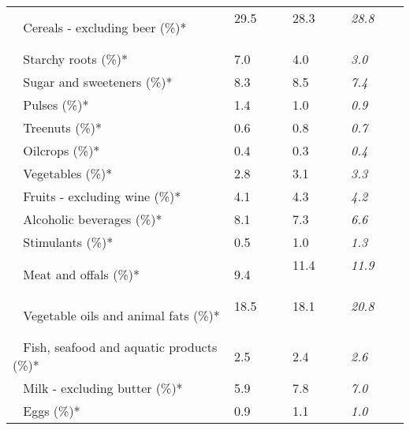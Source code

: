 \begin{tabular}{L{3.9cm} R{1cm} R{1cm} R{1cm}}
	 ~ Cereals - excluding beer (\%)* & 29.5 ~ \ \ & 28.3 ~ \ \ & \textit{28.8} ~ \ \ \\ 
	 ~ Starchy roots (\%)* & 7.0 ~ \ \ & 4.0 ~ \ \ & \textit{3.0} ~ \ \ \\ 
	 ~ Sugar and sweeteners (\%)* & 8.3 ~ \ \ & 8.5 ~ \ \ & \textit{7.4} ~ \ \ \\ 
	 ~ Pulses (\%)* & 1.4 ~ \ \ & 1.0 ~ \ \ & \textit{0.9} ~ \ \ \\ 
	 ~ Treenuts (\%)* & 0.6 ~ \ \ & 0.8 ~ \ \ & \textit{0.7} ~ \ \ \\ 
	 ~ Oilcrops (\%)* & 0.4 ~ \ \ & 0.3 ~ \ \ & \textit{0.4} ~ \ \ \\ 
	 ~ Vegetables (\%)* & 2.8 ~ \ \ & 3.1 ~ \ \ & \textit{3.3} ~ \ \ \\ 
	 ~ Fruits - excluding wine (\%)* & 4.1 ~ \ \ & 4.3 ~ \ \ & \textit{4.2} ~ \ \ \\ 
	 ~ Alcoholic beverages (\%)* & 8.1 ~ \ \ & 7.3 ~ \ \ & \textit{6.6} ~ \ \ \\ 
	 ~ Stimulants (\%)* & 0.5 ~ \ \ & 1.0 ~ \ \ & \textit{1.3} ~ \ \ \\ 
	 ~ Meat and offals (\%)* & 9.4 ~ \ \ & 11.4 ~ \ \ & \textit{11.9} ~ \ \ \\ 
	 ~ Vegetable oils and animal fats (\%)* & 18.5 ~ \ \ & 18.1 ~ \ \ & \textit{20.8} ~ \ \ \\ 
	 ~ Fish, seafood and aquatic products (\%)* & 2.5 ~ \ \ & 2.4 ~ \ \ & \textit{2.6} ~ \ \ \\ 
	 ~ Milk - excluding butter (\%)* & 5.9 ~ \ \ & 7.8 ~ \ \ & \textit{7.0} ~ \ \ \\ 
	 ~ Eggs (\%)* & 0.9 ~ \ \ & 1.1 ~ \ \ & \textit{1.0} ~ \ \ \\ 
       \toprule
      \end{tabular}
      \clearpage
{}
